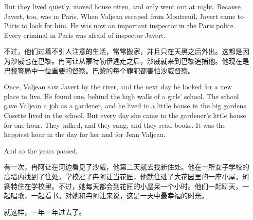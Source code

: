 \documentclass[fontset=ubuntu, zihao=5]{ctexart}
\begin{document}
\begin{paracol}{2}
  But they lived quietly, moved house often, and only went out at night. Because Javert, too, was in Paris. When Valjean escaped from Montreuil, Javert came to Paris to look for him. He was now an important inspector in the Paris police. Every criminal in Paris was afraid of inspector Javert.

  \switchcolumn

  不过，他们过着不引人注意的生活，常常搬家，并且只在天黑之后外出。这都是因为沙威也在巴黎。冉阿让从蒙特勒伊逃走之后，沙威就来到巴黎追捕他。他现在是巴黎警局中一位重要的督察。巴黎的每个罪犯都害怕沙威督察。

  \switchcolumn*

  Once, Valjean saw Javert by the river, and the next day he looked for a new place to live. He found one, behind the high walls of a girls' school. The school gave Valjean a job as a gardener, and he lived in a little house in the big gardens. Cosette lived in the school. But every day she came to the gardener's little house for one hour. They talked, and they sang, and they read books. It was the happiest hour in the day for her and for Jean Valjean.

  And so the years passed.

  \switchcolumn

  有一次，冉阿让在河边看见了沙威，他第二天就去找新住处。他在一所女子学校的高墙内找到了住处。学校雇了冉阿让当花匠，他就住进了大花园里的一座小屋。珂赛特住在学校里。不过，她每天都会到花匠的小屋呆一个小时。他们一起聊天，一起唱歌，一起看书。对她和冉阿让来说，这是一天中最幸福的时光。

  就这样，一年一年过去了。

\end{paracol}

\clearpage
\end{document}
